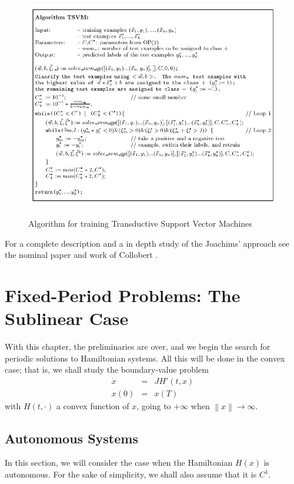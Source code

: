 %
\begin{figure}[H]
\begin{centering}
\includegraphics[scale=0.42]{images/joachims-algorithm}\label{fig:alg-tsvm}
\par\end{centering}

\caption{Algorithm for training Transductive Support Vector Machines \cite{Joachims99c}}


\end{figure}


For a complete description and a in depth study of the Joachims' approach see the nominal paper \cite{Joachims99c}
and work of Collobert \cite{1248609}.


%
\section{Fixed-Period Problems: The Sublinear Case}
%
With this chapter, the preliminaries are over, and we begin the search
for periodic solutions to Hamiltonian systems. All this will be done in
the convex case; that is, we shall study the boundary-value problem
\begin{eqnarray*}
  \dot{x}&=&JH' (t,x)\\
  x(0) &=& x(T)
\end{eqnarray*}
with $H(t,\cdot)$ a convex function of $x$, going to $+\infty$ when
$\left\|x\right\| \to \infty$.

%
\subsection{Autonomous Systems}
%
In this section, we will consider the case when the Hamiltonian $H(x)$
is autonomous. For the sake of simplicity, we shall also assume that it
is $C^{1}$.

